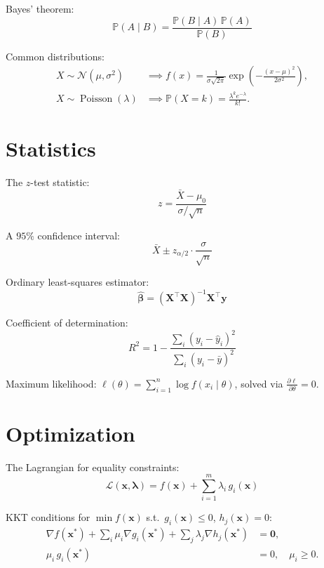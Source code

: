 \documentclass[
    language=english,
    doctype=article,
    institution=none,
    titlestyle=book,
]{../../omnilatex}
\theoremstyle{plain}
\theoremstyle{definition}
\theoremstyle{remark}
\begin{document}
Bayes' theorem:
\[
    \mathbb{P}(A \mid B) = \frac{\mathbb{P}(B \mid A)\,\mathbb{P}(A)}{\mathbb{P}(B)}
\]

Common distributions:
\begin{align}
    X \sim \mathcal{N}(\mu, \sigma^2) &\implies f(x) = \frac{1}{\sigma\sqrt{2\pi}}
        \exp\!\left(-\frac{(x-\mu)^2}{2\sigma^2}\right), \label{eq:normal}\\
    X \sim \operatorname{Poisson}(\lambda) &\implies \mathbb{P}(X = k) = \frac{\lambda^k e^{-\lambda}}{k!}. \label{eq:poisson}
\end{align}

\section{Statistics}
\label{sec:statistics}

The $z$-test statistic:
\[
    z = \frac{\bar{X} - \mu_0}{\sigma / \sqrt{n}}
\]

A $95\%$ confidence interval:
\[
    \bar{X} \pm z_{\alpha/2} \cdot \frac{\sigma}{\sqrt{n}}
\]

Ordinary least-squares estimator:
\[
    \hat{\boldsymbol{\beta}} = (\mathbf{X}^{\top}\mathbf{X})^{-1}\mathbf{X}^{\top}\mathbf{y}
\]

Coefficient of determination:
\[
    R^2 = 1 - \frac{\sum_{i}(y_i - \hat{y}_i)^2}{\sum_{i}(y_i - \bar{y})^2}
\]

Maximum likelihood: $\ell(\theta) = \sum_{i=1}^n \log f(x_i \mid \theta)$, solved via
$\frac{\partial \ell}{\partial \theta} = 0$.

\section{Optimization}
\label{sec:optimization}

The Lagrangian for equality constraints:
\[
    \mathcal{L}(\mathbf{x}, \boldsymbol{\lambda}) = f(\mathbf{x}) + \sum_{i=1}^m \lambda_i\, g_i(\mathbf{x})
\]

KKT conditions for $\min f(\mathbf{x})$ s.t.\ $g_i(\mathbf{x}) \leq 0$, $h_j(\mathbf{x}) = 0$:
\begin{align}
    \nabla f(\mathbf{x}^*) + \sum_{i} \mu_i \nabla g_i(\mathbf{x}^*) + \sum_{j} \lambda_j \nabla h_j(\mathbf{x}^*) &= \mathbf{0}, \label{eq:kkt1}\\
    \mu_i\, g_i(\mathbf{x}^*) &= 0, \quad \mu_i \geq 0. \label{eq:kkt2}
\end{align}
\end{document}
